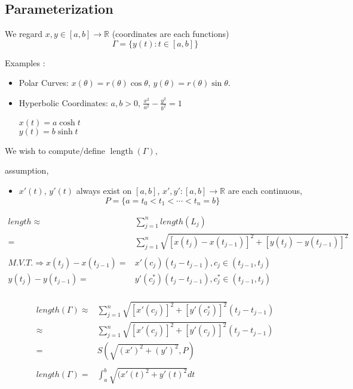\documentclass[12pt]{article}
\theoremstyle{plain}
\newcommand{\mR}{{\mathbb{R}}}
\DeclareMathOperator{\Length}{length}
\begin{document}
\newpage
\subsection{Parameterization}

We regard $x, y \in [a,b] \to \mR$ (coordinates are each functions)
\[
	\Gamma = \{y(t) : t \in [a,b]\} 
\]
{
\color{Brown}
Examples :

\begin{itemize}
	\item Polar Curves: 
		$x(\theta) = r(\theta)\cos \theta$, 
		$y(\theta) = r(\theta) \sin\theta$. 

	\item Hyperbolic Coordinates: 
		$a, b > 0$, $\frac{x^2}{a^2} - \frac{y^2}{b^2} = 1$

		$x(t) = a\cosh t$\\
		$y(t) = b\sinh t$
\end{itemize}
}

We wish to compute/define $\Length(\Gamma)$,

assumption, 
\begin{itemize}
	\item $x'(t)$, $y'(t)$ always exist on $[a,b]$, $x',y' : [a,b] \to
		\mR$ are each continuous, 
		\[
			P = \{a=t_0<t_1<\cdots<t_n=b\}
		\]
\end{itemize}
\begin{align*}
	length 
	\approx& \sum_{j=1}^n length(L_j)\\
	=& \sum_{j=1}^n \sqrt{[x(t_j) - x(t_{j-1})]^2 + [y(t_j)-y(t_{j-1})]^2}\\\\
	M.V.T. \Rightarrow x(t_j) - x(t_{j-1}) =& x'(c_j) (t_j-t_{j-1}),
	c_j \in (t_{j-1}, t_j)\\
	y(t_j) - y(t_{j-1}) =& y'(c^*_j) (t_j-t_{j-1}),
	c_j^* \in (t_{j-1}, t_j)\\
\end{align*}

\begin{align*}
	length(\Gamma) 
	\approx& \sum_{j=1}^n \sqrt{[x'(c_j)]^2 + [y'(c^*_j)]^2}(t_j-t_{j-1})\\
	\approx& \sum_{j=1}^n \sqrt{[x'(c_j)]^2 + [y'(c_j)]^2}(t_j-t_{j-1})\\
	=& S(\sqrt{(x')^2 + (y')^2}, P) \\\\
	length(\Gamma)
	=& \int_a^b \sqrt{(x'(t)^2 + y'(t)^2} dt
\end{align*}
\end{document}
